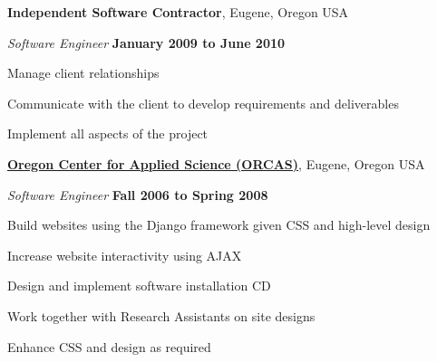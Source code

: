 \documentclass[11pt]{article}
\newenvironment{outerlist}[1][\enskip\textbullet]%
        {\begin{itemize}[#1]}{\end{itemize}%
         \vspace{-.6\baselineskip}}
\newenvironment{innerlist}[1][\enskip\textbullet]%
        {\begin{compactitem}[#1]}{\end{compactitem}}
\newcommand{\blankline}{\quad\pagebreak[2]}
\begin{document}
\textbf{Independent Software Contractor},
Eugene, Oregon USA
\begin{outerlist}

    \item[] \textit{Software Engineer}%
            \hfill \textbf{January 2009 to June 2010}
    \begin{innerlist}
        \item Manage client relationships
        \item Communicate with the client to develop requirements and deliverables
        \item Implement all aspects of the project
    \end{innerlist}

\end{outerlist}

\blankline

\href{http://www.orcasinc.com/}{\textbf{Oregon Center for Applied Science (ORCAS)}},
Eugene, Oregon USA
\begin{outerlist}

    \item[] \textit{Software Engineer}%
            \hfill \textbf{Fall 2006 to Spring 2008}
    \begin{innerlist}
         \item Build websites using the Django framework given CSS and high-level design
         \item Increase website interactivity using AJAX
         \item Design and implement software installation CD
         \item Work together with Research Assistants on site designs
         \item Enhance CSS and design as required
    \end{innerlist}
\end{outerlist}
\end{document}
